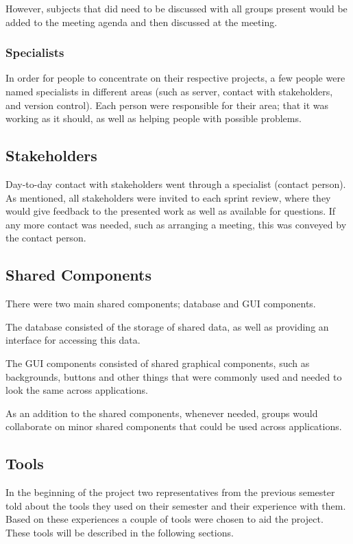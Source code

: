 However, subjects that did need to be discussed with all groups present would be added to the meeting agenda and then discussed at the meeting.

\subsubsection{Specialists}
In order for people to concentrate on their respective projects, a few people were named specialists in different areas (such as server, contact with stakeholders, and version control).
Each person were responsible for their area; that it was working as it should, as well as helping people with possible problems.

\subsection{Stakeholders}
Day-to-day contact with stakeholders went through a specialist (contact person).
As mentioned, all stakeholders were invited to each sprint review, where they would give feedback to the presented work as well as available for questions.
If any more contact was needed, such as arranging a meeting, this was conveyed by the contact person.

\subsection{Shared Components}\label{multiproject:sharedcomponents}
There were two main shared components; database and GUI components.

The database consisted of the storage of shared data, as well as providing an interface for accessing this data.

The GUI components consisted of shared graphical components, such as backgrounds, buttons and other things that were commonly used and needed to look the same across applications.

As an addition to the shared components, whenever needed, groups would collaborate on minor shared components that could be used across applications.

\subsection{Tools}
In the beginning of the project two representatives from the previous semester told about the tools they used on their semester and their experience with them.
Based on these experiences a couple of tools were chosen to aid the project.
These tools will be described in the following sections.

